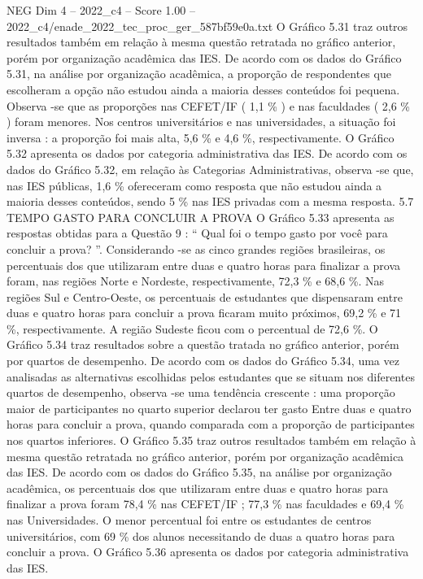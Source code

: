 \begin{textsample}{NEG Dim 4 – 2022\_c4 – Score 1.00 – 2022\_c4/enade\_2022\_tec\_proc\_ger\_587bf59e0a.txt}
O Gráfico 5.31 traz outros resultados também em relação à mesma questão retratada no gráfico anterior, porém por organização acadêmica das IES.
De acordo com os dados do Gráfico 5.31, na análise por organização acadêmica, a proporção de respondentes que escolheram a opção não estudou ainda a maioria desses conteúdos foi pequena.
Observa -se que as proporções nas CEFET/IF ( 1,1 \% ) e nas faculdades ( 2,6 \% ) foram menores.
Nos centros universitários e nas universidades, a situação foi inversa : a proporção foi mais alta, 5,6 \% e 4,6 \%, respectivamente.
O Gráfico 5.32 apresenta os dados por categoria administrativa das IES.
De acordo com os dados do Gráfico 5.32, em relação às Categorias Administrativas, observa -se que, nas IES públicas, 1,6 \% ofereceram como resposta que não estudou ainda a maioria desses conteúdos, sendo 5 \% nas IES privadas com a mesma resposta. 5.7 TEMPO GASTO PARA CONCLUIR A PROVA O Gráfico 5.33 apresenta as respostas obtidas para a Questão 9 : “ Qual foi o tempo gasto por você para concluir a prova? ”.
Considerando -se as cinco grandes regiões brasileiras, os percentuais dos que utilizaram entre duas e quatro horas para finalizar a prova foram, nas regiões Norte e Nordeste, respectivamente, 72,3 \% e 68,6 \%.
Nas regiões Sul e Centro-Oeste, os percentuais de estudantes que dispensaram entre duas e quatro horas para concluir a prova ficaram muito próximos, 69,2 \% e 71 \%, respectivamente.
A região Sudeste ficou com o percentual de 72,6 \%.
O Gráfico 5.34 traz resultados sobre a questão tratada no gráfico anterior, porém por quartos de desempenho.
De acordo com os dados do Gráfico 5.34, uma vez analisadas as alternativas escolhidas pelos estudantes que se situam nos diferentes quartos de desempenho, observa -se uma tendência crescente : uma proporção maior de participantes no quarto superior declarou ter gasto Entre duas e quatro horas para concluir a prova, quando comparada com a proporção de participantes nos quartos inferiores.
O Gráfico 5.35 traz outros resultados também em relação à mesma questão retratada no gráfico anterior, porém por organização acadêmica das IES.
De acordo com os dados do Gráfico 5.35, na análise por organização acadêmica, os percentuais dos que utilizaram entre duas e quatro horas para finalizar a prova foram 78,4 \% nas CEFET/IF ; 77,3 \% nas faculdades e 69,4 \% nas Universidades.
O menor percentual foi entre os estudantes de centros universitários, com 69 \% dos alunos necessitando de duas a quatro horas para concluir a prova.
O Gráfico 5.36 apresenta os dados por categoria administrativa das IES.

\end{textsample}
